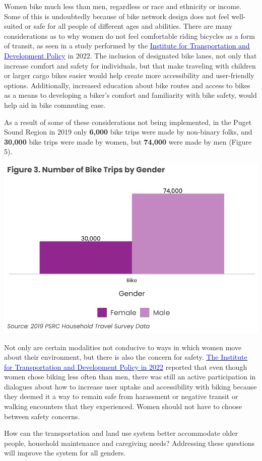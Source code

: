 \documentclass[
  12pt,
]{article}
\begin{document}
\begin{flushleft}
Women bike much less than men, regardless or race and ethnicity or income. Some of this is undoubtedly because of bike network design does not feel well-suited or safe for all people of different ages and abilities. There are many considerations as to why women do not feel comfortable riding bicycles as a form of transit, as seen in a study performed by the \href{https://www.itdp.org/2022/07/06/cyclings-gender-gap/}{\underline{\textcolor{blue}{Institute for Transportation and Development Policy}}} in 2022. The inclusion of designated bike lanes, not only that increase comfort and safety for individuals, but that make traveling with children or larger cargo bikes easier would help create more accessibility and user-friendly options. Additionally, increased education about bike routes and access to bikes as a means to developing a biker's comfort and familiarity with bike safety, would help aid in bike commuting ease. 

As a result of some of these considerations not being implemented, in the Puget Sound Region in 2019 only \textbf{6,000} bike trips were made by non-binary folks, and \textbf{30,000} bike trips were made by women, but \textbf{74,000} were made by men (Figure 5). 
\end{flushleft}

\includegraphics{womens_history_story_draft_files/figure-latex/Bike trips-1.pdf}

\begin{flushleft}
Not only are certain modalities not conducive to ways in which women move about their environment, but there is also the concern for safety. \href{https://www.itdp.org/2022/07/06/cyclings-gender-gap/}{\underline{\textcolor{blue}{The Institute for Transportation and Development Policy in 2022}}} reported that even though women chose biking less often than men, there was still an active participation in dialogues about how to increase user uptake and accessibility with biking because they deemed it a way to remain safe from harassment or negative transit or walking encounters that they experienced. Women should not have to choose between safety concerns.

How can the transportation and land use system better accommodate older people, household maintenance and caregiving needs? Addressing these questions will improve the system for all genders.
\end{flushleft}
\end{document}
